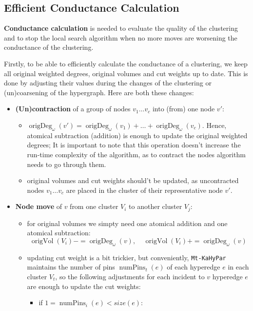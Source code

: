 \documentclass[acmsmall,nonacm,screen,review]{acmart}
\DeclareMathOperator{\origVol}{origVol}
\DeclareMathOperator{\origDeg}{origDeg}
\DeclareMathOperator{\numPins}{numPins}
\begin{document}
\subsection{Efficient Conductance Calculation}
\noindent\textbf{Conductance calculation} is needed to evaluate the
quality of the clustering and to stop the local search algorithm
when no more moves are worsening the conductance of the clustering.

Firstly, to be able to efficiently calculate the conductance of a clustering, 
we keep all original weighted degrees, original volumes and cut weights
up to date. This is done by adjusting their values during the changes of
the clustering or (un)coarsening of the hypergraph. Here are both these 
changes:

\begin{itemize}
    \item \textbf{(Un)contraction} of a group of nodes $v_1 \dots v_c$ into (from) 
one node $v'$:
\begin{itemize}
    \item $\origDeg_\omega(v') = \origDeg_\omega(v_1) + \dots + \origDeg_\omega(v_c)$. 
Hence, atomical subtraction (addition) is enough to update the original 
weighted degrees; It is important to note that this operation doesn't increase 
the run-time complexity of the algorithm, as to contract the nodes algorithm needs
to go through them.
    \item original volumes and cut weights 
should't be updated, as uncontracted nodes $v_1 \dots v_c$ are placed in the cluster 
of their representative node $v'$.
\end{itemize}
    \item \textbf{Node move} of $v$ from one cluster $V_i$ to another cluster $V_j$:
\begin{itemize}
    \item for original volumes we simpty need one atomical addition and one atomical
subtraction:
\[\origVol(V_i) -= \origDeg_\omega(v), \ \ \ \ \ \origVol(V_i) += \origDeg_\omega(v)\]

    \item updating cut weight is a bit trickier, but conveniently, \texttt{Mt-KaHyPar}
maintains the number of pins $\numPins_t(e)$ of each hyperedge $e$ in each cluster $V_t$, 
so the following adjustments for each incident to $v$ hyperedge $e$ are enough to 
update the cut weights:
\begin{itemize}
    \item if $1 = \numPins_i(e) < size(e)$: 


\end{itemize}
\end{itemize}
\end{itemize}
\end{document}
